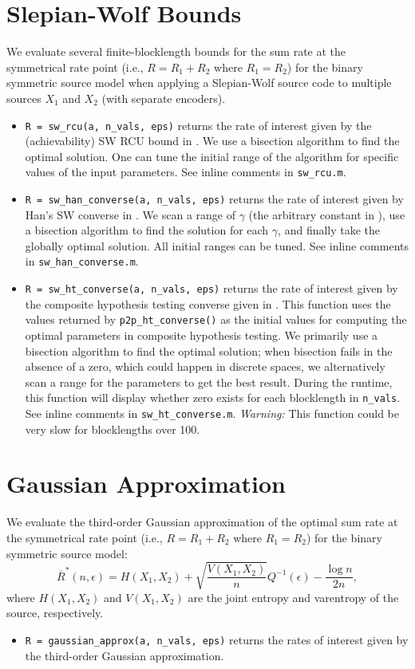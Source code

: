 \documentclass[a4paper,11p]{memoir}
\begin{document}
\section{Slepian-Wolf Bounds}
We evaluate several finite-blocklength bounds for the sum rate at the symmetrical rate point (i.e., $R = R_1 + R_2$ where $R_1 = R_2$) for the binary symmetric source model when applying a Slepian-Wolf source code to multiple sources $X_1$ and $X_2$ (with separate encoders). 
\begin{itemize}
\item \verb|R = sw_rcu(a, n_vals, eps)| returns the rate of interest given by the (achievability) SW RCU bound in \cite[Th.~18]{CEK19}. We use a bisection algorithm to find the optimal solution. One can tune the initial range of the algorithm for specific values of the input parameters. See inline comments in \verb|sw_rcu.m|.
\item \verb|R = sw_han_converse(a, n_vals, eps)| returns the rate of interest given by Han's SW converse in \cite[Lemma~7.2.2]{HAN03}. We scan a range of $\gamma$ (the arbitrary constant in \cite[Lemma~7.2.2]{HAN03}), use a bisection algorithm to find the solution for each $\gamma$, and finally take the globally optimal solution. All initial ranges can be tuned. See inline comments in \verb|sw_han_converse.m|.
\item \verb|R = sw_ht_converse(a, n_vals, eps)| returns the rate of interest given by the composite hypothesis testing converse given in \cite[Th.~19]{CEK19}. This function uses the values returned by \verb|p2p_ht_converse()| as the initial values for computing the optimal parameters in composite hypothesis testing. We primarily use a bisection algorithm to find the optimal solution; when bisection fails in the absence of a zero, which could happen in discrete spaces, we alternatively scan a range for the parameters to get the best result. During the runtime, this function will display whether zero exists for each blocklength in \verb|n_vals|. See inline comments in \verb|sw_ht_converse.m|.
\textit{Warning:} This function could be very slow for blocklengths over 100.
\end{itemize}

\section{Gaussian Approximation}
We evaluate the third-order Gaussian approximation of the optimal sum rate at the symmetrical rate point (i.e., $R = R_1 + R_2$ where $R_1 = R_2$) for the binary symmetric source model:
$$
\overline{R}^*(n, \epsilon) = H(X_1, X_2) + \sqrt{\frac{V(X_1, X_2)}{n}}Q^{-1}(\epsilon) - \frac{\log n}{2n}, $$
where $H(X_1, X_2)$ and $V(X_1, X_2)$ are the joint entropy and varentropy of the source, respectively.

\begin{itemize}
\item \verb|R = gaussian_approx(a, n_vals, eps)| returns the rates of interest given by the third-order Gaussian approximation.
\end{itemize}



\end{document}
